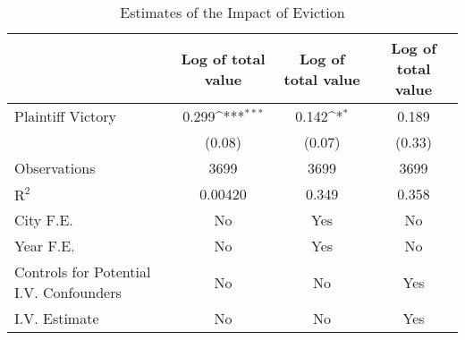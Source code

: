 \begin{table}[htbp]\centering
\def\sym#1{\ifmmode^{#1}\else\(^{#1}\)\fi}
\caption{Estimates of the Impact of Eviction}
\begin{tabular}{l*{3}{c}}
\toprule
                    &\multicolumn{1}{c}{Log of total value}&\multicolumn{1}{c}{Log of total value}&\multicolumn{1}{c}{Log of total value}\\
\midrule
Plaintiff Victory   &       0.299\sym{***}&       0.142\sym{*}  &       0.189         \\
                    &      (0.08)         &      (0.07)         &      (0.33)         \\
\midrule
Observations        &        3699         &        3699         &        3699         \\
$\text{R}^2$        &     0.00420         &       0.349         &       0.358         \\
City F.E.           &          No         &         Yes         &          No         \\
Year F.E.           &          No         &         Yes         &          No         \\
Controls for Potential I.V. Confounders&          No         &          No         &         Yes         \\
I.V. Estimate       &          No         &          No         &         Yes         \\
\bottomrule
\end{tabular}
\end{table}

